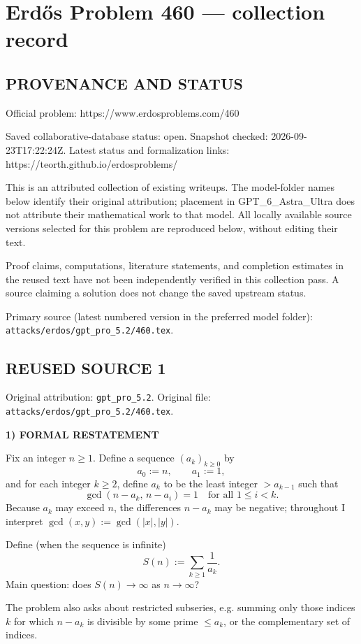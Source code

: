 \section*{Erd\H{o}s Problem 460 --- collection record}

\subsection*{PROVENANCE AND STATUS}
Official problem: https://www.erdosproblems.com/460

Saved collaborative-database status: open.
Snapshot checked: 2026-09-23T17:22:24Z.
Latest status and formalization links: https://teorth.github.io/erdosproblems/

This is an attributed collection of existing writeups. The model-folder names below identify their original attribution; placement in GPT\_6\_Astra\_Ultra does not attribute their mathematical work to that model. All locally available source versions selected for this problem are reproduced below, without editing their text.

Proof claims, computations, literature statements, and completion estimates in the reused text have not been independently verified in this collection pass. A source claiming a solution does not change the saved upstream status.

Primary source (latest numbered version in the preferred model folder): \texttt{attacks/erdos/gpt\_pro\_5.2/460.tex}.

\subsection*{REUSED SOURCE 1}
Original attribution: \texttt{gpt\_pro\_5.2}.
Original file: \texttt{attacks/erdos/gpt\_pro\_5.2/460.tex}.


\noindent\textbf{1) FORMAL RESTATEMENT}

Fix an integer $n\ge 1$. Define a sequence $(a_k)_{k\ge 0}$ by
\[a_0:=n,\qquad a_1:=1,\]
and for each integer $k\ge 2$, define $a_k$ to be the least integer $>a_{k-1}$ such that
\[\gcd(n-a_k,\,n-a_i)=1\quad\text{for all }1\le i<k.
\]
Because $a_k$ may exceed $n$, the differences $n-a_k$ may be negative; throughout I interpret $\gcd(x,y):=\gcd(|x|,|y|)$.

Define (when the sequence is infinite)
\[S(n):=\sum_{k\ge 1} \frac1{a_k}.
\]
Main question: does $S(n)\to\infty$ as $n\to\infty$?

The problem also asks about restricted subseries, e.g. summing only those indices $k$ for which $n-a_k$ is divisible by some prime $\le a_k$, or the complementary set of indices.

